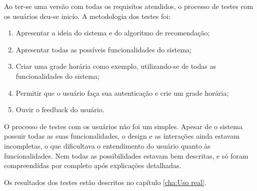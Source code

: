 Ao ter-se uma versão com todas os requisitos atendidos, o processo de testes com os usuários deu-se inicío. A metodologia dos testes foi:

\begin{enumerate}
    \item Apresentar a ideia do sistema e do algoritmo de recomendação;
    \item Apresentar todas as possíveis funcionalidades do sistema;
    \item Criar uma grade horária como exemplo, utilizando-se de todas as funcionalidades do sistema;
    \item Permitir que o usuário faça sua autenticação e crie um grade horária;
    \item Ouvir o feedback do usuário.
\end{enumerate}

O processo de testes com os usuários não foi um simples. Apesar de o sistema possuir todas as suas funcionalidades, o design e as interações ainda estavam incompletas, o que dificultava o entendimento do usuário quanto às funcionalidades. Nem todas as possibilidades estavam bem descritas, e só foram compreendidas por completo após explicações detalhadas.

Os resultados dos testes estão descritos no capítulo \ref{cha:Uso real}.